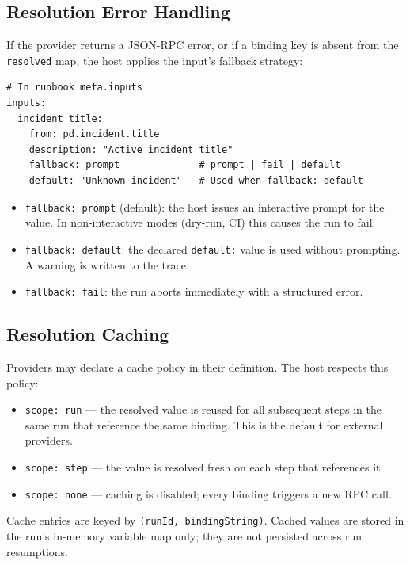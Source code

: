 \subsection{Resolution Error Handling}

If the provider returns a JSON-RPC error, or if a binding key is absent from
the \texttt{resolved} map, the host applies the input's fallback strategy:

\begin{verbatim}
# In runbook meta.inputs
inputs:
  incident_title:
    from: pd.incident.title
    description: "Active incident title"
    fallback: prompt              # prompt | fail | default
    default: "Unknown incident"   # Used when fallback: default
\end{verbatim}

\begin{itemize}
  \item \texttt{fallback: prompt} (default): the host issues an interactive
        prompt for the value.  In non-interactive modes (dry-run, CI) this
        causes the run to fail.
  \item \texttt{fallback: default}: the declared \texttt{default:} value is
        used without prompting.  A warning is written to the trace.
  \item \texttt{fallback: fail}: the run aborts immediately with a structured
        error.
\end{itemize}

\subsection{Resolution Caching}

Providers may declare a cache policy in their definition.  The host respects
this policy:

\begin{itemize}
  \item \texttt{scope: run} — the resolved value is reused for all subsequent
        steps in the same run that reference the same binding.  This is the
        default for external providers.
  \item \texttt{scope: step} — the value is resolved fresh on each step that
        references it.
  \item \texttt{scope: none} — caching is disabled; every binding triggers a
        new RPC call.
\end{itemize}

Cache entries are keyed by \texttt{(runId, bindingString)}.  Cached values are
stored in the run's in-memory variable map only; they are not persisted across
run resumptions.

